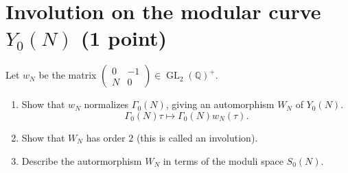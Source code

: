 \documentclass[paper=a4, fontsize=11pt]{scrartcl} %
\numberwithin{equation}{section} %
\numberwithin{figure}{section} %
\numberwithin{table}{section} %
\newcommand{\bbQ}{\mathbb{Q}}
\newcommand{\bbH}{\mathbb{H}}
\newcommand{\QQ}{\bbQ}
\newcommand{\HH}{\bbH}
\DeclareMathOperator{\GL}{GL}
\newcommand{\smtx}[4]{\left(\begin{smallmatrix}#1&#2\\#3&#4\end{smallmatrix}\right)}
\begin{document}
\section{Involution on the modular curve $Y_0(N)$ (1 point)}
Let $w_N$ be the matrix $\smtx 0{-1}{N}{0} \in \GL_2(\QQ)^+$.
\begin{enumerate}
\item Show that $w_N$ normalizes $\Gamma_0(N)$, giving an automorphism $W_N$ of $Y_0(N)$.
\[
\Gamma_0(N)\tau\mapsto \Gamma_0(N)w_N(\tau).
\]
\item Show that $W_N$ has order $2$ (this is called an involution).
\item Describe the autormorphism $W_N$ in terms of the moduli space $S_0(N)$.
\end{enumerate}
\end{document}
